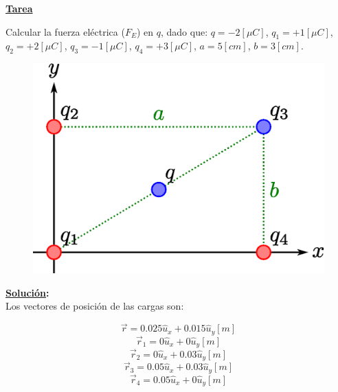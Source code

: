 \documentclass[letter,11pt]{article}
\begin{document}
\begin{center}
    {\Large \bf{\underline{Tarea}}}
\end{center}

Calcular la fuerza eléctrica ($F_E$) en $q$, dado que: $q = -2[\mu C]$,
$q_1 = +1[\mu C]$, $q_2 = +2[\mu C]$, $q_3 = -1[\mu C]$, $q_4 = +3[\mu C]$, 
$a = 5[cm]$, $b = 3[cm]$.

\begin{figure}[!h]
\centering
\includegraphics[scale=0.45]{resources/f1.eps}
\end{figure}

\vspace{0.5cm}
\textbf{\underline{Solución}:} \\

Los vectores de posición de las cargas son:

\begin{equation*}
    \vec{r} = 0.025 \hat{u}_x + 0.015 \hat{u}_y [m]
\end{equation*}
\begin{equation*}
    \vec{r}_1 = 0 \hat{u}_x + 0 \hat{u}_y [m]
\end{equation*}
\begin{equation*}
    \vec{r}_2 = 0 \hat{u}_x + 0.03 \hat{u}_y [m]
\end{equation*}
\begin{equation*}
    \vec{r}_3 = 0.05 \hat{u}_x + 0.03 \hat{u}_y [m]
\end{equation*}
\begin{equation*}
    \vec{r}_4 = 0.05 \hat{u}_x + 0 \hat{u}_y [m]
\end{equation*}
\end{document}
